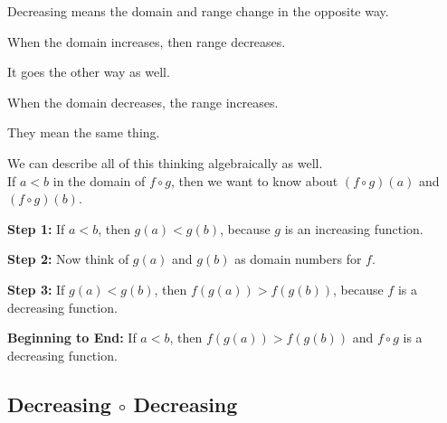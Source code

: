 \documentclass{ximera}
\begin{document}
\begin{warning}

Decreasing means the domain and range change in the opposite way.

When the domain increases, then range decreases.

It goes the other way as well.

When the domain decreases, the range increases.

They mean the same thing.


\end{warning}






We can describe all of this thinking algebraically as well. \\


If $a < b$ in the domain of $f \circ g$, then we want to know about $(f \circ g)(a)$  and $(f \circ g)(b)$.



\textbf{Step 1:}  If $a < b$, then $g(a) < g(b)$, because $g$ is an increasing function.


\textbf{Step 2:}  Now think of $g(a)$ and $g(b)$ as domain numbers for $f$.


\textbf{Step 3:}  If $g(a) < g(b)$, then $f(g(a)) > f(g(b))$, because $f$ is a decreasing function.


\textbf{Beginning to End:} If $a < b$, then $f(g(a)) > f(g(b))$ and $f \circ g$ is a decreasing function.














































\subsection{Decreasing $\circ$ Decreasing}
\end{document}
